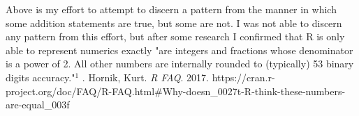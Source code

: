 \documentclass{article}\usepackage[]{graphicx}\usepackage[]{color}
\begin{document}
Above is my effort to attempt to discern a pattern from the manner in which some addition statements are true, but some are not.  I was not able to discern any pattern from this effort, but after some research I confirmed that R is only able to represent numerics exactly "are integers and fractions whose denominator is a power of 2. All other numbers are internally rounded to (typically) 53 binary digits accuracy."$^1$
. Hornik, Kurt.  \emph{R FAQ}.  2017.  https://cran.r-project.org/doc/FAQ/R-FAQ.html\#Why-doesn\_0027t-R-think-these-numbers-are-equal\_003f
\end{document}
